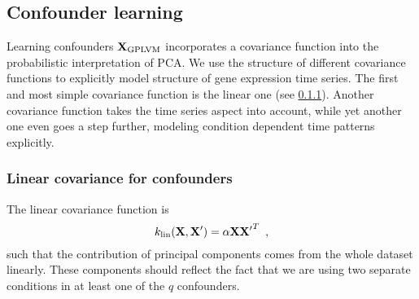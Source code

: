 \documentclass[11pt,a4paper,titlepage,twoside,tablecaptionabove]{article}
\begin{document}
\subsection{Confounder learning}
\label{sec:confounder-learning}

Learning confounders ${\bf X}_\text{GPLVM}$ incorporates a covariance
function into the probabilistic interpretation of PCA. We use the
structure of different covariance functions to explicitly model
structure of gene expression time series. The first and most simple
covariance function is the linear one (see
\ref{sec:line-covar-conf}). Another covariance function takes the time
series aspect into account, while yet another one even goes a step
further, modeling condition dependent time patterns explicitly.

\subsubsection{Linear covariance for confounders}
\label{sec:line-covar-conf}

The linear covariance function is
\begin{equation}
  \label{eq:5}
  k_\text{lin}({\bf X},{\bf X'}) = \alpha {\bf X}{\bf X'}^T\enspace,
\end{equation}
such that the contribution of principal components comes from the
whole dataset linearly. These components should reflect the fact that
we are using two separate conditions in at least one of the $q$
confounders. 


\end{document}
